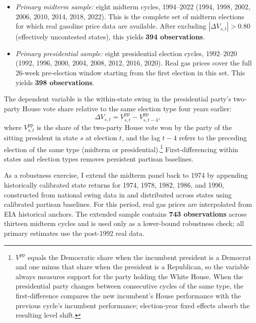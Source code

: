 \documentclass[12pt]{article}
\begin{document}
\begin{itemize}
  \item \textit{Primary midterm sample:} eight midterm cycles, 1994--2022 (1994, 1998, 2002, 2006, 2010, 2014, 2018, 2022). This is the complete set of midterm elections for which real gasoline price data are available. After excluding $|\Delta V_{s,t}|>0.80$ (effectively uncontested states), this yields \textbf{394 observations}.
  \item \textit{Primary presidential sample:} eight presidential election cycles, 1992--2020 (1992, 1996, 2000, 2004, 2008, 2012, 2016, 2020). Real gas prices cover the full 26-week pre-election window starting from the first election in this set. This yields \textbf{398 observations}.
\end{itemize}

The dependent variable is the within-state swing in the presidential party's two-party House vote share relative to the same election type four years earlier:
\begin{equation}
  \Delta V_{s,t} = V^{\mathrm{pp}}_{s,t} - V^{\mathrm{pp}}_{s,t-4},
  \label{eq:swing}
\end{equation}
where $V^{\mathrm{pp}}_{s,t}$ is the share of the two-party House vote won by the party of the sitting president in state $s$ at election $t$, and the lag $t-4$ refers to the preceding election of the same type (midterm or presidential).\footnote{$V^{\mathrm{pp}}$ equals the Democratic share when the incumbent president is a Democrat and one minus that share when the president is a Republican, so the variable always measures support for the party holding the White House. When the presidential party changes between consecutive cycles of the same type, the first-difference compares the new incumbent's House performance with the previous cycle's incumbent performance; election-year fixed effects absorb the resulting level shift.} First-differencing within states and election types removes persistent partisan baselines.

As a robustness exercise, I extend the midterm panel back to 1974 by appending historically calibrated state returns for 1974, 1978, 1982, 1986, and 1990, constructed from national swing data in \citet{CQ_almanac} and distributed across states using calibrated partisan baselines. For this period, real gas prices are interpolated from EIA historical anchors. The extended sample contains \textbf{743 observations} across thirteen midterm cycles and is used only as a lower-bound robustness check; all primary estimates use the post-1992 real data.
\end{document}
